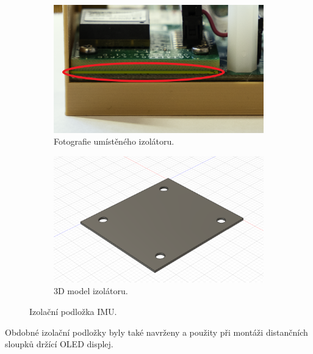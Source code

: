 \begin{figure}
     \centering
     \begin{subfigure}[b]{0.45\textwidth}
         \centering
         \includegraphics[width=\textwidth]{obrazky/isolatorADIS}
         \caption{Fotografie umístěného izolátoru.}
       
     \end{subfigure}
     \hfill
     \begin{subfigure}[b]{0.45\textwidth}
         \centering
         \includegraphics[width=\textwidth]{obrazky/ModelIsolatorADIS}
         \caption{3D model izolátoru.}
         
     \end{subfigure}
        \caption{Izolační podložka IMU.}
        \label{fig:adisIsolator}
\end{figure}

Obdobné izolační podložky byly také navrženy a použity při montáži distančních sloupků držící \ac{OLED} displej.

